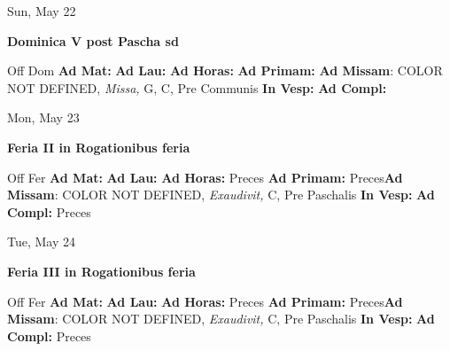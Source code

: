 \documentclass[10pt]{memoir}
\begin{document}
\begin{center}
\begin{minipage}{3.5in}
\vspace{2em}
\begin{center}Sun, May 22
\end{center}
\textbf{ \large Dominica V post Pascha
\textnormal{\normalsize sd}}

\begin{justify}Off Dom
\textbf{Ad Mat: }
\textbf{Ad Lau: }
\textbf{Ad Horas: }
\textbf{Ad Primam: }\textbf{Ad Missam}: COLOR NOT DEFINED, \textit{Missa,} G, C, Pre Communis
\textbf{In Vesp: }
\textbf{Ad Compl: }
\end{justify}
\end{minipage}
\end{center}

\begin{center}
\begin{minipage}{3.5in}
\vspace{2em}
\begin{center}Mon, May 23
\end{center}
\textbf{ \large Feria II in Rogationibus
\textnormal{\normalsize feria}}

\begin{justify}Off Fer
\textbf{Ad Mat: }
\textbf{Ad Lau: }
\textbf{Ad Horas: }Preces
\textbf{Ad Primam: }Preces\textbf{Ad Missam}: COLOR NOT DEFINED, \textit{Exaudivit,} C, Pre Paschalis
\textbf{In Vesp: }
\textbf{Ad Compl: }Preces
\end{justify}
\end{minipage}
\end{center}

\begin{center}
\begin{minipage}{3.5in}
\vspace{2em}
\begin{center}Tue, May 24
\end{center}
\textbf{ \large Feria III in Rogationibus
\textnormal{\normalsize feria}}

\begin{justify}Off Fer
\textbf{Ad Mat: }
\textbf{Ad Lau: }
\textbf{Ad Horas: }Preces
\textbf{Ad Primam: }Preces\textbf{Ad Missam}: COLOR NOT DEFINED, \textit{Exaudivit,} C, Pre Paschalis
\textbf{In Vesp: }
\textbf{Ad Compl: }Preces
\end{justify}
\end{minipage}
\end{center}
\end{document}
